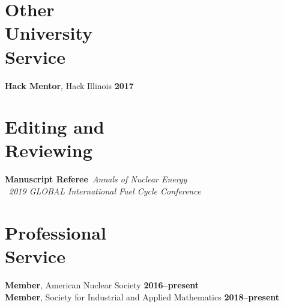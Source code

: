 \documentclass[margin,line]{resume}
\begin{document}
\begin{resume}
    \section{\mysidestyle Other\\University\\Service}
		\textbf{Hack Mentor}, Hack Illinois \hfill \textbf{2017}\vspace{.5mm}\\%

\section{\mysidestyle Editing and\\Reviewing}
    \textbf{Manuscript Referee}~\hfill \emph{Annals of Nuclear Energy}\\%
						\mbox{}~\hfill \emph{2019 GLOBAL International Fuel 
    Cycle Conference}\\%
\section{\mysidestyle Professional\\Service}
\textbf{Member}, American Nuclear Society  \hfill 
\textbf{2016--present}\vspace{.5mm}\\
\textbf{Member}, Society for Industrial and Applied Mathematics  \hfill 
\textbf{2018--present}\vspace{.5mm}\\%

\end{resume}
\end{document}
